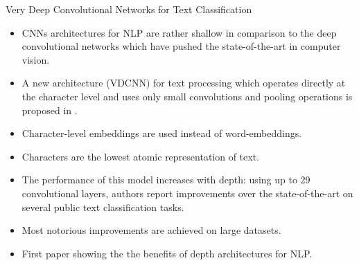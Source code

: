 \documentclass[handout]{beamer}
\begin{document}
\begin{frame}{Very Deep Convolutional Networks for Text Classification}
\begin{scriptsize}
\begin{itemize}
\item CNNs architectures for NLP are rather shallow in comparison to the deep convolutional networks which have pushed the state-of-the-art in computer vision.
\item A new architecture (VDCNN) for text processing which operates directly at the character level and uses only small convolutions and pooling operations is proposed in \cite{conneau2017very}.

\item Character-level embeddings are used instead of word-embeddings.

\item Characters are the lowest atomic representation of text. 

\item The performance of this model increases with depth: using up to 29 convolutional layers, authors report improvements over the state-of-the-art on several public text classification tasks. 

\item Most notorious improvements are achieved on large datasets.

\item First paper showing the the benefits  of  depth architectures for NLP.
\end{itemize}
\end{scriptsize}
\end{frame}
\end{document}
